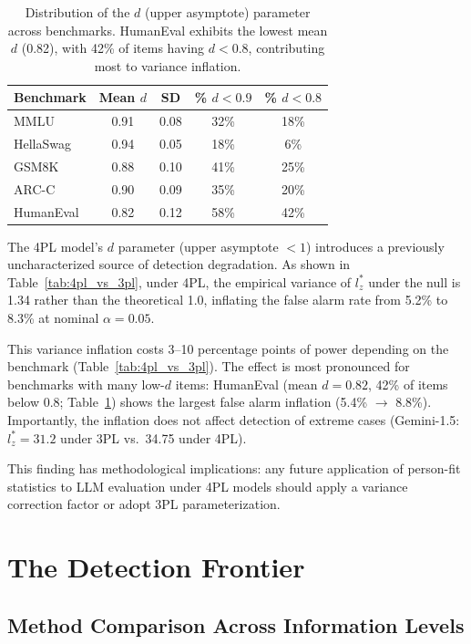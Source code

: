 \documentclass[11pt,a4paper]{article}
\newcommand{\lzstar}{$l_{z}^{*}$}
\begin{document}
\begin{table}[t]
\centering
\caption{Distribution of the $d$ (upper asymptote) parameter across benchmarks. HumanEval exhibits the lowest mean $d$ (0.82), with 42\% of items having $d < 0.8$, contributing most to variance inflation.}
\label{tab:d_distribution}
\small
\begin{tabular}{@{}lcccc@{}}
\toprule
Benchmark & Mean $d$ & SD & \% $d < 0.9$ & \% $d < 0.8$ \\
\midrule
MMLU & 0.91 & 0.08 & 32\% & 18\% \\
HellaSwag & 0.94 & 0.05 & 18\% & 6\% \\
GSM8K & 0.88 & 0.10 & 41\% & 25\% \\
ARC-C & 0.90 & 0.09 & 35\% & 20\% \\
HumanEval & 0.82 & 0.12 & 58\% & 42\% \\
\bottomrule
\end{tabular}
\end{table}

The 4PL model's $d$ parameter (upper asymptote $< 1$) introduces a previously uncharacterized source of detection degradation. As shown in Table~\ref{tab:4pl_vs_3pl}, under 4PL, the empirical variance of \lzstar{} under the null is 1.34 rather than the theoretical 1.0, inflating the false alarm rate from 5.2\% to 8.3\% at nominal $\alpha = 0.05$.

This variance inflation costs 3--10 percentage points of power depending on the benchmark (Table~\ref{tab:4pl_vs_3pl}). The effect is most pronounced for benchmarks with many low-$d$ items: HumanEval (mean $d = 0.82$, 42\% of items below 0.8; Table~\ref{tab:d_distribution}) shows the largest false alarm inflation (5.4\% $\to$ 8.8\%). Importantly, the inflation does not affect detection of extreme cases (Gemini-1.5: $l_z^* = 31.2$ under 3PL vs.\ 34.75 under 4PL).

This finding has methodological implications: any future application of person-fit statistics to LLM evaluation under 4PL models should apply a variance correction factor or adopt 3PL parameterization.

\section{The Detection Frontier}

\subsection{Method Comparison Across Information Levels}
\label{sec:baseline}
\end{document}
